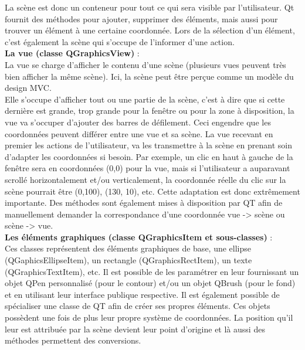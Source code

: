 \documentclass[french]{article}
\begin{document}
	La scène est donc un conteneur pour tout ce qui sera visible par l'utilisateur. Qt fournit des méthodes pour ajouter, supprimer des éléments, mais aussi pour trouver un élément à une certaine coordonnée. Lors de la sélection d'un élément, c'est également la scène qui s'occupe de l'informer d'une action. \\
	
	\textbf{La vue (classe QGraphicsView)} : \\
	La vue se charge d'afficher le contenu d'une scène (plusieurs vues peuvent très bien afficher la même scène). Ici, la scène peut être perçue comme un modèle du design MVC. \\
	Elle s'occupe d'afficher tout ou une partie de la scène, c'est à dire que si cette dernière est grande, trop grande pour la fenêtre ou pour la zone à disposition, la vue va s'occuper d'ajouter des barres de défilement. Ceci engendre que les coordonnées peuvent différer entre une vue et sa scène. La vue recevant en premier les actions de l'utilisateur, va les transmettre à la scène en prenant soin d'adapter les coordonnées si besoin. Par exemple, un clic en haut à gauche de la fenêtre sera en coordonnées (0,0) pour la vue, mais si l'utilisateur a auparavant scrollé horizontalement et/ou verticalement, la coordonnée réelle du clic sur la scène pourrait être (0,100), (130, 10), etc. Cette adaptation est donc extrêmement importante. Des méthodes sont également mises à disposition par QT afin de manuellement demander la correspondance d'une coordonnée vue -> scène ou scène -> vue. \\
	
	\textbf{Les éléments graphiques (classe QGraphicsItem et sous-classes)} : \\
	Ces classes représentent des éléments graphiques de base, une ellipse (QGaphicsEllipseItem), un rectangle (QGraphicsRectItem), un texte (QGraphicsTextItem), etc. Il est possible de les paramétrer en leur fournissant un objet QPen personnalisé (pour le contour) et/ou un objet QBrush (pour le fond) et en utilisant leur interface publique respective. Il est également possible de spécialiser une classe de QT afin de créer ses propres éléments.
	Ces objets possèdent une fois de plus leur propre système de coordonnées. La position qu'il leur est attribuée par la scène devient leur point d'origine et là aussi des méthodes permettent des conversions.
	
	\pagebreak
	
\end{document}
